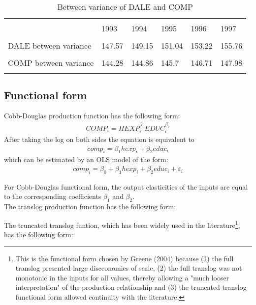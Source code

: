 \documentclass[12pt,a4paper]{article}\usepackage[]{graphicx}\usepackage[]{color}
\begin{document}
\begin{table}[htbp] \centering 
  \caption{Between variance of DALE and COMP} 
  \label{Between variance of DALE and COMP} 
  \normalsize
\begin{tabular}{p{5cm} p{1.2cm} p{1.2cm} p{1.2cm} p{1.2cm} p{1.2cm}} 
\\[-1.8ex]\hline 
\hline \\[-1.8ex] 
 & 1993 & 1994 & 1995 & 1996 & 1997 \\ 
\hline \\[-1.8ex] 
DALE between variance & 147.57 & 149.15 & 151.04 & 153.22 & 155.76 \\
\hline \\[-1.8ex] 
COMP between variance & 144.28 & 144.86 & 145.7 & 146.71 & 147.98 \\
\hline
\hline \\[-1.8ex] 
\end{tabular} 
\end{table}





\subsection{Functional form}
Cobb-Douglas production function has the following form:
\begin{gather}
COMP_i = HEXP_i^{\beta_1}EDUC_i^{\beta_2}
\end{gather}
After taking the log on both sides the equation is equivalent to
\begin{gather}
comp_i = \beta_1 hexp_i + \beta_2 educ_i
\end{gather}
which can be estimated by an OLS model of the form:
\begin{gather}
comp_i = \beta_0 + \beta_1 hexp_i + \beta_2 educ_i + \varepsilon_i
\end{gather}

For Cobb-Douglas functional form, the output elasticities of the inputs are equal to the corresponding coefficients $\beta_1$ and $\beta_2$. \\

The translog production function has the following form: 

The truncated translog funtion, which has been widely used in the literature\footnote{This is the functional form chosen by Greene (2004) because (1) the full translog presented large diseconomies of scale, (2) the full translog was not monotonic in the inputs for all values, thereby allowing a "much looser interpretation" of the production relationship and (3) the truncated translog functional form allowed continuity with the literature.}, has the following form:
\end{document}
